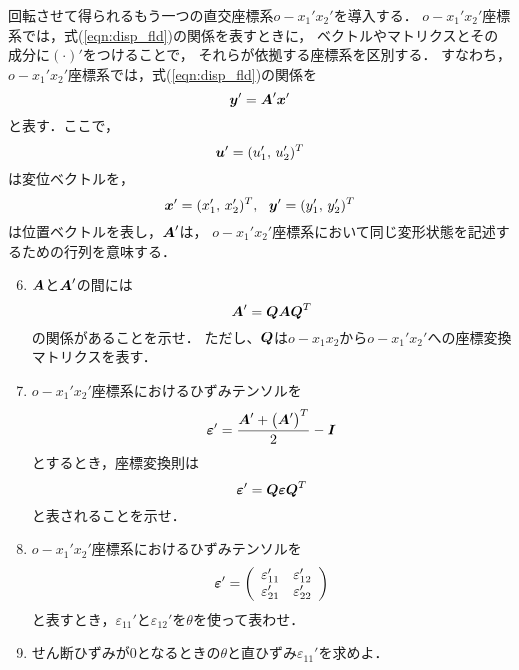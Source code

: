 \documentclass[10pt,a4j]{jarticle}
\begin{document}
回転させて得られるもう一つの直交座標系$o-x_1'x_2'$を導入する．
$o-x_1'x_2'$座標系では，式(\ref{eqn:disp_fld})の関係を表すときに，
ベクトルやマトリクスとその成分に$(\cdot)'$をつけることで，
それらが依拠する座標系を区別する．
すなわち，$o-x_1'x_2'$座標系では，式(\ref{eqn:disp_fld})の関係を
\begin{equation}
	\mbox{\boldmath $y$}'=\mbox{\boldmath $A$}'\mbox{\boldmath $x$}'
	\label{eqn:disp_fld2}
\end{equation}
と表す．ここで，
\begin{equation}
	\mbox{\boldmath $u$}'=(u_1',\, u_2')^T
\end{equation}
は変位ベクトルを，
\begin{equation}
	\mbox{\boldmath $x$}'=(x_1',\, x_2')^T, \ \ \mbox{\boldmath $y$}'=(y_1',\, y_2')^T
\end{equation}
は位置ベクトルを表し，$\mbox{\boldmath $A$}'$は，
$o-x_1'x_2'$座標系において同じ変形状態を記述するための行列を意味する．
\begin{enumerate}
\setcounter{enumi}{5}
\item
	$\mbox{\boldmath $A$}$と$\mbox{\boldmath $A$}'$の間には
	\[
		\mbox{\boldmath $A$}'=\mbox{\boldmath $Q$}\mbox{\boldmath $A$}\mbox{\boldmath $Q$}^T
	\]
	の関係があることを示せ．
	ただし、$\mbox{\boldmath $Q$}$は$o-x_1x_2$から$o-x_1'x_2'$への座標変換マトリクスを表す．
\item
	$o-x_1'x_2'$座標系におけるひずみテンソルを
	\[
		\mbox{\boldmath $\varepsilon$}'=\frac{\mbox{\boldmath $A$}'+\left(\mbox{\boldmath $A$}'\right)^T}{2}-\mbox{\boldmath $I$}
	\]
	とするとき，座標変換則は
	\[
		\mbox{\boldmath $\varepsilon$}'=\mbox{\boldmath $Q$}\mbox{\boldmath $\varepsilon$}\mbox{\boldmath $Q$}^T
	\]
	と表されることを示せ．
\item
	$o-x_1'x_2'$座標系におけるひずみテンソルを
	\[
	\mbox{\boldmath $\varepsilon$}'
	=
	\left(
	\begin{array}{cc}
		\varepsilon_{11}' & \varepsilon_{12}' \\
		\varepsilon_{21}' & \varepsilon_{22}'
	\end{array}
	\right)
	\]
	と表すとき，$\varepsilon_{11}'$と$\varepsilon_{12}'$を$\theta$を使って表わせ．
\item
	せん断ひずみが0となるときの$\theta$と直ひずみ$\varepsilon_{11}'$を求めよ．
\end{enumerate}
\end{document}
